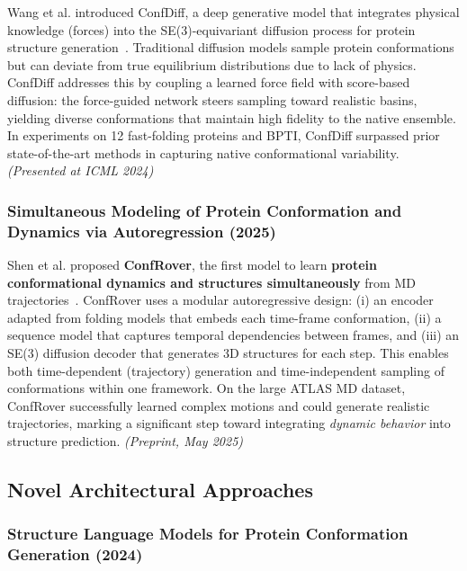 Wang et al.
introduced ConfDiff, a deep generative model that integrates physical knowledge (forces) into the SE(3)-equivariant diffusion process for protein structure generation~\cite{Wang2024ConfDiff}.
Traditional diffusion models sample protein conformations but can deviate from true equilibrium distributions due to lack of physics.
ConfDiff addresses this by coupling a learned force field with score-based diffusion: the force-guided network steers sampling toward realistic basins, yielding diverse conformations that maintain high fidelity to the native ensemble.
In experiments on 12 fast-folding proteins and BPTI, ConfDiff surpassed prior state-of-the-art methods in capturing native conformational variability. \textit{(Presented at ICML 2024)}

\subsubsection{Simultaneous Modeling of Protein Conformation and Dynamics via Autoregression (2025)}

Shen et al.
proposed \textbf{ConfRover}, the first model to learn \textbf{protein conformational dynamics and structures simultaneously} from MD trajectories~\cite{Shen2025ConfRover}.
ConfRover uses a modular autoregressive design: (i) an encoder adapted from folding models that embeds each time-frame conformation, (ii) a sequence model that captures temporal dependencies between frames, and (iii) an SE(3) diffusion decoder that generates 3D structures for each step.
This enables both time-dependent (trajectory) generation and time-independent sampling of conformations within one framework.
On the large ATLAS MD dataset, ConfRover successfully learned complex motions and could generate realistic trajectories, marking a significant step toward integrating \textit{dynamic behavior} into structure prediction. \textit{(Preprint, May 2025)}

\subsection{Novel Architectural Approaches}

\subsubsection{Structure Language Models for Protein Conformation Generation (2024)}

